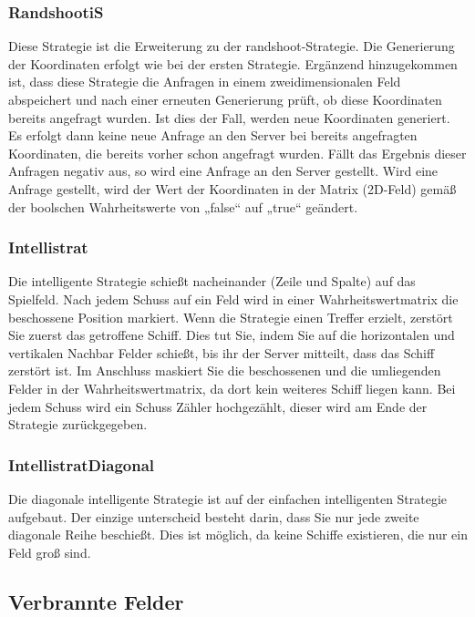 \subsubsection{RandshootiS}

Diese Strategie ist die Erweiterung zu der randshoot-Strategie. Die Generierung der
Koordinaten erfolgt wie bei der ersten Strategie. Ergänzend hinzugekommen ist, dass
diese Strategie die Anfragen in einem zweidimensionalen Feld abspeichert und nach
einer erneuten Generierung prüft, ob diese Koordinaten bereits angefragt wurden. Ist
dies der Fall, werden neue Koordinaten generiert. Es erfolgt dann keine neue Anfrage an
den Server bei bereits angefragten Koordinaten, die bereits vorher schon angefragt
wurden. Fällt das Ergebnis dieser Anfragen negativ aus, so wird eine Anfrage an den
Server gestellt. Wird eine Anfrage gestellt, wird der Wert der Koordinaten in der Matrix
(2D-Feld) gemäß der boolschen Wahrheitswerte von „false“ auf „true“ geändert.

\subsubsection{Intellistrat}

Die intelligente Strategie schießt nacheinander (Zeile und Spalte) auf das Spielfeld. Nach jedem Schuss auf ein Feld wird in einer Wahrheitswertmatrix die 
beschossene Position markiert. Wenn die Strategie einen Treffer erzielt, zerstört Sie zuerst das getroffene Schiff. Dies tut Sie, indem Sie auf die horizontalen 
und vertikalen Nachbar Felder schießt, bis ihr der Server mitteilt, dass das Schiff zerstört ist. Im Anschluss maskiert Sie die beschossenen und die umliegenden 
Felder in der Wahrheitswertmatrix, da dort kein weiteres Schiff liegen kann. Bei jedem Schuss wird ein Schuss Zähler hochgezählt, dieser wird am Ende der 
Strategie zurückgegeben.

\subsubsection{IntellistratDiagonal}

Die diagonale intelligente Strategie ist auf der einfachen intelligenten Strategie aufgebaut. Der einzige unterscheid besteht darin, dass Sie nur jede zweite 
diagonale Reihe beschießt. Dies ist möglich, da keine Schiffe existieren, die nur ein Feld groß sind.


\subsection{Verbrannte Felder}

